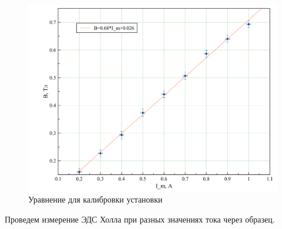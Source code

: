 \documentclass[a4paper, 12pt]{article}
\begin{document}
	\begin {figure}[H]
		\begin{center}
			\includegraphics[width = 0.9 \textwidth]{B(I)}
			\caption{Уравнение для калибровки установки}
		\end{center}
	\end {figure}
	
Проведем измерение ЭДС Холла при разных значениях тока через образец. 
\end{document}
